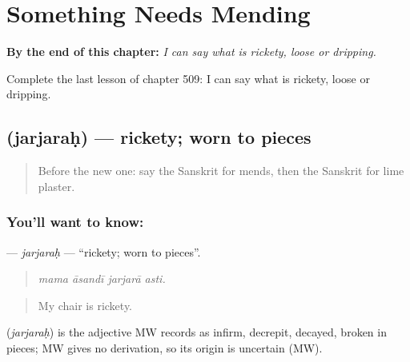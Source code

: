 
\chapter{Something Needs Mending}
\label{ch:sa-something-needs-mending}

\begin{chapteropening}
\textbf{By the end of this chapter:} \emph{I can say what is rickety, loose or dripping.}

Complete the last lesson of chapter 509: I can say what is rickety, loose or dripping.
\end{chapteropening}

\section[\texorpdfstring{\sk{जर्जरः} (jarjaraḥ)}{जर्जरः (jarjaraḥ)}]{ (jarjaraḥ) — rickety; worn to pieces}

\label{lesson:SA-C509-jarjarah}



\begin{quote}
Before the new one: say the Sanskrit for mends, then the Sanskrit for lime plaster.
\end{quote}

\subsection*{You'll want to know: }
\textbf{} — \emph{jarjaraḥ} — \textquotedblleft{}rickety; worn to pieces\textquotedblright{}.

\begin{quote}
   
\end{quote}

\begin{quote}
\emph{mama āsandī jarjarā asti.}
\end{quote}

\begin{quote}
My chair is rickety.
\end{quote}

\begin{cousinweb}
\textbf{} (\emph{jarjaraḥ}) is the adjective MW records as infirm, decrepit, decayed, broken in pieces; MW gives no derivation, so its origin is uncertain (MW).
\end{cousinweb}

